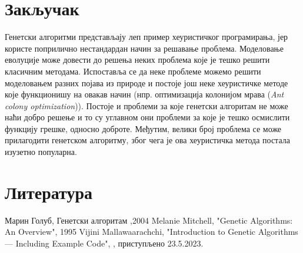 \documentclass{article}
\begin{document}
\section{Закључак}
Генетски алгоритми представљају леп пример хеуристичког програмирања, јер користе поприлично
нестандардан начин за решавање проблема. Моделовање еволуције може довести до решења неких проблема 
које је тешко решити класичним методама. Испоставља се да неке проблеме можемо решити моделовањем 
разних појава из природе и постоје још неке хеуристичке методе које функционишу на овакав начин
(нпр. оптимизација колонијом мрава (\textit{Ant colony optimization})). Постоје и проблеми за које
генетски алгоритам не може наћи добро решење и то су углавном они проблеми за које је тешко осмислити 
функцију грешке, односно доброте. Међутим, велики број проблема се може прилагодити генетском
алгоритму, због чега је ова хеуристичка метода постала изузетно популарна.


\section{Литература}
\noindent[1] Марин Голуб, Генетски алгоритам ,2004 \newline
[2] Melanie Mitchell, "Genetic Algorithms: An Overview", 1995 \newline
[3] Vijini Mallawaarachchi, "Introduction to Genetic Algorithms — Including Example Code", 
, приступљено 23.5.2023. 
\end{document}
